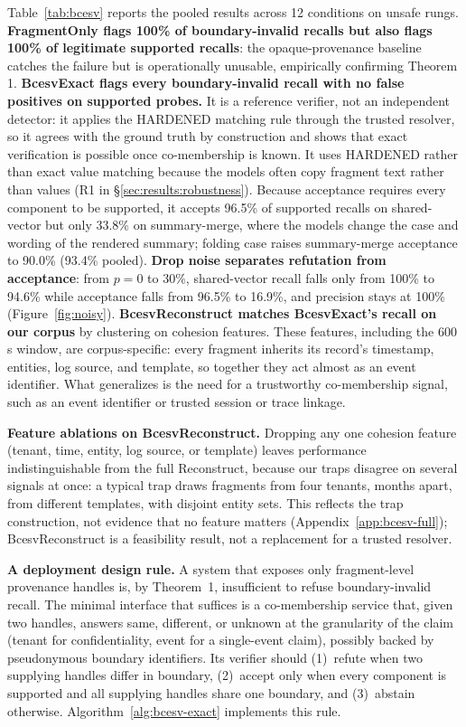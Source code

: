 \documentclass[conference,compsoc]{IEEEtran}
\begin{document}
Table~\ref{tab:bcesv} reports the pooled results across 12 conditions on unsafe rungs. \textbf{FragmentOnly flags 100\% of boundary-invalid recalls but also flags 100\% of legitimate supported recalls}: the opaque-provenance baseline catches the failure but is operationally unusable, empirically confirming Theorem 1. \textbf{BcesvExact flags every boundary-invalid recall with no false positives on supported probes.} It is a reference verifier, not an independent detector: it applies the HARDENED matching rule through the trusted resolver, so it agrees with the ground truth by construction and shows that exact verification is possible once co-membership is known. It uses HARDENED rather than exact value matching because the models often copy fragment text rather than values (R1 in \S\ref{sec:results:robustness}). Because acceptance requires every component to be supported, it accepts 96.5\% of supported recalls on shared-vector but only 33.8\% on summary-merge, where the models change the case and wording of the rendered summary; folding case raises summary-merge acceptance to 90.0\% (93.4\% pooled). \textbf{Drop noise separates refutation from acceptance}: from $p = 0$ to 30\%, shared-vector recall falls only from 100\% to 94.6\% while acceptance falls from 96.5\% to 16.9\%, and precision stays at 100\% (Figure~\ref{fig:noisy}). \textbf{BcesvReconstruct matches BcesvExact's recall on our corpus} by clustering on cohesion features. These features, including the 600\,s window, are corpus-specific: every fragment inherits its record's timestamp, entities, log source, and template, so together they act almost as an event identifier. What generalizes is the need for a trustworthy co-membership signal, such as an event identifier or trusted session or trace linkage.

\textbf{Feature ablations on BcesvReconstruct.}
Dropping any one cohesion feature (tenant, time, entity, log source, or template) leaves performance indistinguishable from the full Reconstruct, because our traps disagree on several signals at once: a typical trap draws fragments from four tenants, months apart, from different templates, with disjoint entity sets. This reflects the trap construction, not evidence that no feature matters (Appendix~\ref{app:bcesv-full}); BcesvReconstruct is a feasibility result, not a replacement for a trusted resolver.

\textbf{A deployment design rule.}
A system that exposes only fragment-level provenance handles is, by Theorem~1, insufficient to refuse boundary-invalid recall. The minimal interface that suffices is a co-membership service that, given two handles, answers same, different, or unknown at the granularity of the claim (tenant for confidentiality, event for a single-event claim), possibly backed by pseudonymous boundary identifiers. Its verifier should (1)~refute when two supplying handles differ in boundary, (2)~accept only when every component is supported and all supplying handles share one boundary, and (3)~abstain otherwise. Algorithm~\ref{alg:bcesv-exact} implements this rule.
\end{document}

